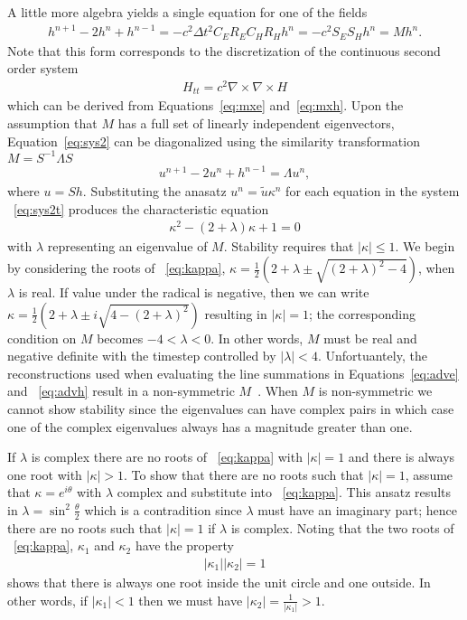 \documentclass[12pt]{article}
\begin{document}
A little more algebra yields a single equation for one of the fields
\begin{eqnarray}
h^{n+1} - 2h^n + h^{n-1} = -c^2 \Delta t^2C_E R_E C_H R_H h^n = -c^2S_ES_Hh^n = M h^n.\label{eq:sys2}
\end{eqnarray}
Note that this form corresponds to the discretization of the continuous second order
system 
\begin{eqnarray}
H_{tt} = c^2\nabla \times\nabla \times H\label{eq:sys2c}
\end{eqnarray}
which can be derived from Equations~\ref{eq:mxe} and~\ref{eq:mxh}.
Upon the assumption that $M$ has a full set of linearly independent eigenvectors, 
Equation~\ref{eq:sys2} can be diagonalized using the similarity transformation
$M=S^{-1} \Lambda S$
\begin{eqnarray}
u^{n+1} - 2u^n + h^{n-1} = \Lambda u^n,\label{eq:sys2t}
\end{eqnarray}
where $u=Sh$.  Substituting the anasatz $u^n={\tilde u}\kappa^n$ for
each equation in the system ~\ref{eq:sys2t} produces the
characteristic equation
\begin{eqnarray}
\kappa^2 - (2+\lambda)\kappa +1 = 0\label{eq:kappa}
\end{eqnarray}
with $\lambda$ representing an eigenvalue of $M$.  Stability requires
that $|\kappa|\le 1$.  We begin by considering the roots of
~\ref{eq:kappa}, $\kappa = \frac{1}{2}(2+\lambda \pm
\sqrt{(2+\lambda)^2-4})$, when $\lambda$ is real.  If value under
the radical is negative, then we can write $\kappa =
\frac{1}{2}(2+\lambda \pm i\sqrt{4-(2+\lambda)^2})$ resulting in
$|\kappa| =1$; the corresponding condition on $M$ becomes
$-4<\lambda<0$.  In other words, $M$ must be real and negative
definite with the timestep controlled by $|\lambda|<4$.
Unfortuantely, the reconstructions used when evaluating the line
summations in Equations~\ref{eq:adve} and ~\ref{eq:advh} result in a
non-symmetric $M$~\cite{gedney}.  When $M$ is non-symmetric we cannot
show stability since the eigenvalues can have complex pairs in which case
one of the complex eigenvalues always has a magnitude greater than one.

If $\lambda$ is complex there are no roots of ~\ref{eq:kappa} with
$|\kappa|=1$ and there is always one root with $|\kappa|>1$.  To show
that there are no roots such that $|\kappa|=1$, assume that
$\kappa=e^{i\theta}$ with $\lambda$ complex and substitute into
~\ref{eq:kappa}.  This ansatz results in
$\lambda=\sin^2\frac{\theta}{2}$ which is a contradition since
$\lambda$ must have an imaginary part; hence there are no roots such
that $|\kappa|=1$ if $\lambda$ is complex.  Noting that the two roots
of ~\ref{eq:kappa}, $\kappa_1$ and $\kappa_2$ have the property
\begin{eqnarray}
|\kappa_1||\kappa_2| = 1
\end{eqnarray} 
shows that there is always one root inside the unit circle and one
outside.  In other words, if $|\kappa_1|<1$ then we must have $|\kappa_2|=\frac{1}{|\kappa_1|}>1$.
\end{document}
